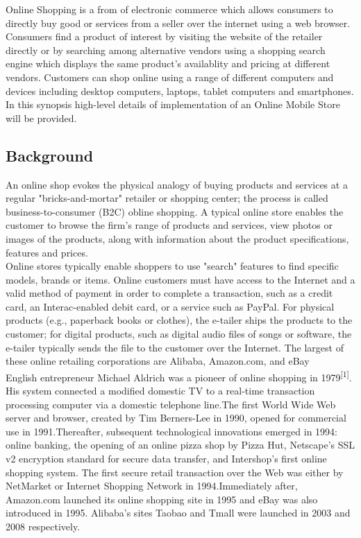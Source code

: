 \documentclass[hidelinks,a4paper,12pt]{article}
\begin{document}
Online Shopping is a from of electronic commerce which allows consumers to directly buy good or services from a seller over the internet using a web browser. Consumers find a product of interest by visiting the website of the retailer directly or by searching among alternative vendors using a shopping search engine which displays the same product's availablity and pricing at different vendors. Customers can shop online using a range of different computers and devices including desktop computers, laptops, tablet computers and smartphones.
\\

In this synopsis high-level details of implementation of an Online Mobile Store will be provided.
\bigskip

\newpage


\subsection{Background}
An online shop evokes the physical analogy of buying products and services at a regular "bricks-and-mortar" retailer or shopping center; the process is called business-to-consumer (B2C) obline shopping. A typical online store enables the customer to browse the firm's range of products and services, view photos or images of the products, along with information about the product specifications, features and prices.
\\

Online stores typically enable shoppers to use "search" features to find specific models, brands or items. Online customers must have access to the Internet and a valid method of payment in order to complete a transaction, such as a credit card, an Interac-enabled debit card, or a service such as PayPal. For physical products (e.g., paperback books or clothes), the e-tailer ships the products to the customer; for digital products, such as digital audio files of songs or software, the e-tailer typically sends the file to the customer over the Internet. The largest of these online retailing corporations are Alibaba, Amazon.com, and eBay
\\

English entrepreneur Michael Aldrich was a pioneer of online shopping in 1979\textsuperscript{[1]}. His system connected a modified domestic TV to a real-time transaction processing computer via a domestic telephone line.The first World Wide Web server and browser, created by Tim Berners-Lee in 1990, opened for commercial use in 1991.Thereafter, subsequent technological innovations emerged in 1994: online banking, the opening of an online pizza shop by Pizza Hut, Netscape's SSL v2 encryption standard for secure data transfer, and Intershop's first online shopping system. The first secure retail transaction over the Web was either by NetMarket or Internet Shopping Network in 1994.Immediately after, Amazon.com launched its online shopping site in 1995 and eBay was also introduced in 1995. Alibaba's sites Taobao and Tmall were launched in 2003 and 2008 respectively.
\\
\end{document}
